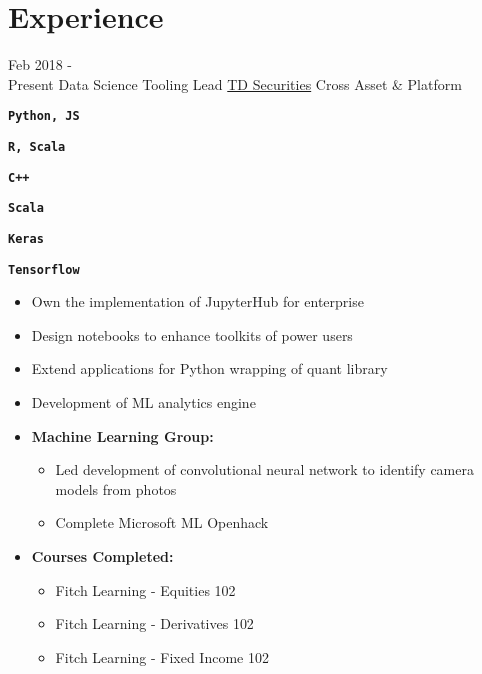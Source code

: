 \documentclass[letterpaper]{twentysecondcv} %
\begin{document}
\makeprofile %

\newcommand{\skill}[1]{\texttt{\textbf{#1}}}


\section{Experience}

\begin{twenty} %

	\twentyitem
		{Feb 2018 - \\ Present}
		{Data Science Tooling Lead}
		{\href{https://www.tdsecurities.com}{TD Securities}}
		{Cross Asset \& Platform}
		{\item\skill{Python, JS}
		\item\skill{R, Scala}
		\item\skill{C++}
		\item\skill{Scala}
		\item
		\item\skill{Keras}
		\item\skill{Tensorflow}
		}
		{
			\begin{itemize}
				\item Own the implementation of JupyterHub for enterprise
				\item Design notebooks to enhance toolkits of power users
				\item Extend applications for Python wrapping of quant library
				\item Development of ML analytics engine
				\item \textbf{Machine Learning Group:}
				\begin{itemize}
					\item Led development of convolutional neural network to identify camera models from photos
					\item Complete Microsoft ML Openhack
				\end{itemize}
				\item \textbf{Courses Completed:}
				\begin{itemize}
					\item Fitch Learning - Equities 102
					\item Fitch Learning - Derivatives 102
					\item Fitch Learning - Fixed Income 102
				\end{itemize}
			\end{itemize}
		}	
		

\end{twenty}
\end{document}
